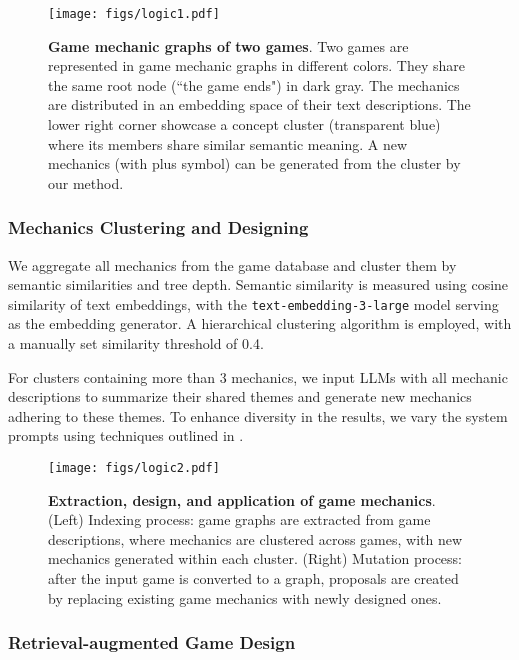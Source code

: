 \begin{figure}[ht]
  \centering
  \texttt{[image: figs/logic1.pdf]}
  \caption{\textbf{Game mechanic graphs of two games}. Two games are represented in game mechanic graphs in different colors. They share the same root node (``the game ends") in dark gray. The mechanics are distributed in an embedding space of their text descriptions. The lower right corner showcase a concept cluster (transparent blue) where its members share similar semantic meaning. A new mechanics (with plus symbol) can be generated from the cluster by our method. }\label{fig:game_graph}
\end{figure}



\subsubsection{Mechanics Clustering and Designing}

We aggregate all mechanics from the game database and cluster them by semantic similarities and tree depth. Semantic similarity is measured using cosine similarity of text embeddings, with the \texttt{text-embedding-3-large} model serving as the embedding generator. A hierarchical clustering algorithm is employed, with a manually set similarity threshold of 
0.4.

For clusters containing more than 3 mechanics, we input LLMs with all mechanic descriptions to summarize their shared themes and generate new mechanics adhering to these themes. To enhance diversity in the results, we vary the system prompts using techniques outlined in \cite{fernando_promptbreeder_2023}.

\begin{figure}[ht]
  \centering
  \texttt{[image: figs/logic2.pdf]}
  \caption{\textbf{Extraction, design, and application of game mechanics}. (Left) Indexing process: game graphs are extracted from game descriptions, where mechanics are clustered across games, with new mechanics generated within each cluster. (Right) Mutation process: after the input game is converted to a graph, proposals are created by replacing existing game mechanics with newly designed ones. }\label{fig:game_graph2}
\end{figure}

\subsubsection{Retrieval-augmented Game Design}

